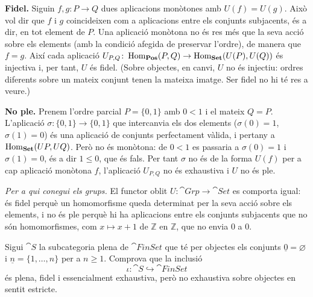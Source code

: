 \begin{solucio}
\textbf{Fidel.} Siguin $f,g\colon P\to Q$ dues aplicacions monòtones amb $U(f)=U(g)$. Això vol dir que $f$ i $g$ coincideixen com a aplicacions entre els conjunts subjacents, és a dir, en tot element de $P$. Una aplicació monòtona no és res més que la seva acció sobre els elements (amb la condició afegida de preservar l'ordre), de manera que $f=g$. Així cada aplicació $U_{P,Q}\colon\operatorname{Hom}_{\mathbf{Pos}}(P,Q)\to\operatorname{Hom}_{\mathbf{Set}}(U(P),U(Q))$ és injectiva i, per tant, $U$ és fidel. (Sobre objectes, en canvi, $U$ no és injectiu: ordres diferents sobre un mateix conjunt tenen la mateixa imatge. Ser fidel no hi té res a veure.)

\textbf{No ple.} Prenem l'ordre parcial $P=\{0,1\}$ amb $0<1$ i el mateix $Q=P$. L'aplicació $\sigma\colon\{0,1\}\to\{0,1\}$ que intercanvia els dos elements ($\sigma(0)=1$, $\sigma(1)=0$) és una aplicació de conjunts perfectament vàlida, i pertany a $\operatorname{Hom}_{\mathbf{Set}}(U P,U Q)$. Però no és monòtona: de $0<1$ es passaria a $\sigma(0)=1$ i $\sigma(1)=0$, és a dir $1\le 0$, que és fals. Per tant $\sigma$ no és de la forma $U(f)$ per a cap aplicació monòtona $f$, l'aplicació $U_{P,Q}$ no és exhaustiva i $U$ no és ple.

\emph{Per a qui conegui els grups.} El functor oblit $U\colon\cat{Grp}\to\cat{Set}$ es comporta igual: és fidel perquè un homomorfisme queda determinat per la seva acció sobre els elements, i no és ple perquè hi ha aplicacions entre els conjunts subjacents que no són homomorfismes, com $x\mapsto x+1$ de $\mathbb Z$ en $\mathbb Z$, que no envia $0$ a $0$.
\end{solucio}

\begin{exercici}\label{pr-esquelet-finset}
Sigui $\cat{S}$ la subcategoria plena de $\cat{FinSet}$ que té per objectes els conjunts $\underline{0}=\varnothing$ i $\underline{n}=\{1,\dots,n\}$ per a $n\geq 1$. Comprova que la inclusió
\[
\iota\colon\cat{S}\hookrightarrow\cat{FinSet}
\]
és plena, fidel i essencialment exhaustiva, però no exhaustiva sobre objectes en sentit estricte.
\end{exercici}

